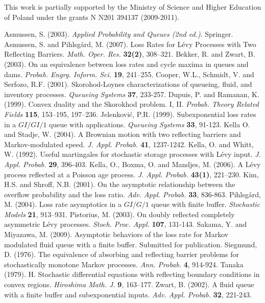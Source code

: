 \documentclass{aptpub}
\begin{document}
\ack
This work is partially supported by the Ministry of Science and
Higher Education of Poland under the grants N N201 394137
(2009-2011).

\begin{thebibliography}{99}
 {\sc Asmussen, S.} (2003). {\em Applied Probability and Queues (2nd ed.)}. Springer.
 {\sc Asmussen, S. and Pihlsg{\aa}rd, M.} (2007). Loss Rates for L\'{e}vy Processes with Two Reflecting Barriers.
{\em Math. Oper. Res.} {\bf 32(2)}, 308--321.
 {\sc Bekker, R. and Zwart, B.} (2003). On an equivalence between loss rates and cycle maxima in
queues and dams. {\em Probab. Engrg. Inform. Sci.} {\bf 19}, 241--255.
 {\sc Cooper, W.L., Schmidt, V. and Serfozo, R.F.} (2001). Skorohod-Loynes characterizations of queueing, fluid, and inventory processes. {\em Queueing Systems} {\bf 37}, 233-257.
 {\sc Dupuis, P. and Ramanan, K.} (1999). Convex duality and the Skorokhod problem. I, II. {\em Probab. Theory Related Fields}  {\bf 115}, 153--195, 197--236.
 {\sc Jelenkovi\'{c}, P.R.} (1999). Subexponential loss rates in a $GI/GI/1$ queue with applications.
{\em Queueing Systems} {\bf 33}, 91-123.
 {\sc Kella O. and Stadje, W.} (2004). A Brownian motion with two reflecting barriers and Markov-modulated speed. {\em J. Appl. Probab.} {\bf 41}, 1237-1242.
 {\sc Kella, O. and Whitt, W.} (1992). Useful martingales for stochastic storage processes with L\'{e}vy
input. {\em J. Appl. Probab.} {\bf 29}, 396-403.
{\sc Kella, O., Boxma, O. and Mandjes, M.} (2006). A L\'{e}vy process reflected at a Poisson age process.
{\em J. Appl. Probab.} {\bf 43(1)}, 221--230.
 {\sc Kim, H.S. and Shroff, N.B.} (2001). On the asymptotic relationship between the overflow probability and the loss ratio. {\em Adv. Appl. Probab.} {\bf 33}, 836-863.
 {\sc Pihlsg{\aa}rd, M.} (2004). Loss rate asymptotics in a $GI/G/1$ queue with finite buffer.
{\em Stochastic Models} {\bf 21}, 913--931.
 {\sc Pistorius, M.} (2003). On doubly reflected completely asymmetric L\'{e}vy processes. {\em Stoch.
Proc. Appl.} {\bf 107}, 131-143.
 {\sc Sakama, Y. and Miyazawa, M.} (2009). Asymptotic behaviors of the loss rate for Markov modulated fluid queue with a finite buffer. Submitted for publication.
 {\sc Siegmund, D.} (1976). The equivalence of absorbing and reflecting barrier problems for stochastically monotone Markov processes. {\em Ann. Probab.} {\bf 4}, 914-924.
 {\sc Tanaka} (1979). H.  Stochastic differential equations with reflecting boundary conditions in convex
regions. {\em Hiroshima Math. J.} {\bf 9}, 163--177.
 {\sc Zwart, B.} (2002). A fluid queue with a finite buffer and subexponential inputs. {\em Adv. Appl.
Probab.} {\bf 32}, 221-243.

\end{thebibliography}
\end{document}
